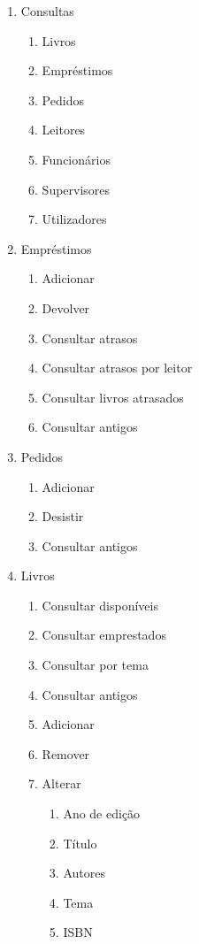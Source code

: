 \documentclass[12pt,a4paper,reqno]{report}
\numberwithin{figure}{section}
\numberwithin{equation}{section}
\begin{document}
\begin{enumerate}
  \item Consultas
  \begin{enumerate}[label*=\arabic*.]
    \item Livros
    \item Empréstimos
    \item Pedidos
    \item Leitores
    \item Funcionários
    \item Supervisores
    \item Utilizadores
  \end{enumerate}
  \item Empréstimos
  \begin{enumerate}[label*=\arabic*.]
    \item Adicionar
    \item Devolver
    \item Consultar atrasos
    \item Consultar atrasos por leitor
    \item Consultar livros atrasados
    \item Consultar antigos
  \end{enumerate}
  \item Pedidos
  \begin{enumerate}[label*=\arabic*.]
    \item Adicionar
    \item Desistir
    \item Consultar antigos
  \end{enumerate}
  \item Livros
  \begin{enumerate}[label*=\arabic*.]
    \item Consultar disponíveis
    \item Consultar emprestados
    \item Consultar por tema
    \item Consultar antigos
    \item Adicionar
    \item Remover
    \item Alterar
	\begin{enumerate}[label*=\arabic*.]
		\item Ano de edição
		\item Título
		\item Autores
		\item Tema
		\item ISBN

\end{enumerate}
\end{enumerate}
\end{enumerate}
\end{document}
